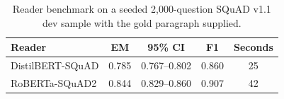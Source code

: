 \begin{table}[H]
\centering
\small
\caption{Reader benchmark on a seeded 2,000-question SQuAD v1.1 dev sample with the gold paragraph supplied.}
\label{tab:squad}
\begin{tabular}{lcccc}
\toprule
Reader & EM & 95\% CI & F1 & Seconds \\
\midrule
DistilBERT-SQuAD & 0.785 & 0.767--0.802 & 0.860 & 25 \\
RoBERTa-SQuAD2 & 0.844 & 0.829--0.860 & 0.907 & 42 \\
\bottomrule
\end{tabular}
\end{table}